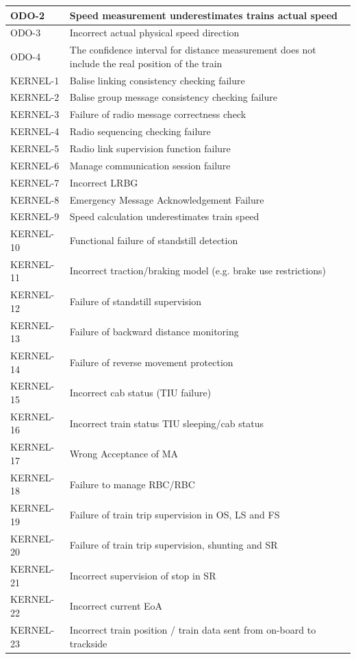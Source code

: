 \documentclass{template/openetcs_article}
\begin{document}
\begin{center}
\begin{longtable}{|m{3cm}|m{13cm}|}
ODO-2 & Speed measurement underestimates trains actual speed \\\hline
ODO-3 & Incorrect actual physical speed direction \\\hline  
ODO-4 & The confidence interval for distance measurement does not include the real position of the train \\\hline
KERNEL-1 & Balise linking consistency checking failure \\\hline
KERNEL-2 & Balise group message consistency checking failure \\\hline
KERNEL-3 & Failure of radio message correctness check \\\hline
KERNEL-4 & Radio sequencing checking failure \\\hline
KERNEL-5 & Radio link supervision function failure \\\hline
KERNEL-6 & Manage communication session failure \\\hline
KERNEL-7 & Incorrect LRBG \\\hline
KERNEL-8 & Emergency Message Acknowledgement Failure \\\hline
KERNEL-9 & Speed calculation underestimates train speed\\\hline
KERNEL-10 & Functional failure of standstill detection \\\hline
KERNEL-11 & Incorrect traction/braking model (e.g. brake use restrictions) \\\hline
KERNEL-12 & Failure of standstill supervision \\\hline
KERNEL-13 & Failure of backward distance monitoring \\\hline
KERNEL-14 & Failure of reverse movement protection\\\hline
KERNEL-15 & Incorrect cab status (TIU failure) \\\hline
KERNEL-16 & Incorrect train status TIU sleeping/cab status \\\hline
KERNEL-17 & Wrong Acceptance of MA \\\hline
KERNEL-18 & Failure to manage RBC/RBC \\\hline
KERNEL-19 & Failure of train trip supervision in OS, LS and FS \\\hline
KERNEL-20 & Failure of train trip supervision, shunting and SR \\\hline
KERNEL-21 & Incorrect supervision of stop in SR \\\hline
KERNEL-22 & Incorrect current EoA \\\hline
KERNEL-23 & Incorrect train position / train data sent from on-board to trackside \\\hline

\end{longtable}
\end{center}
\end{document}
